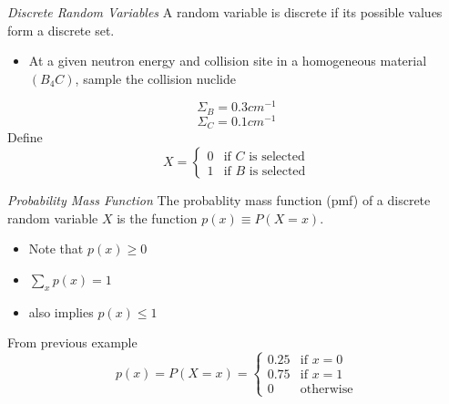 \emph{Discrete Random Variables}
 A random variable is discrete if its possible values form a discrete set.
     \begin{itemize}
      \item At a given neutron energy and collision site in a homogeneous material $(B_{4}C)$, sample the collision nuclide
     \end{itemize}
     \begin{equation*}
         \Sigma_{B} = 0.3 cm^{-1}
     \end{equation*}
     \begin{equation*}
         \Sigma_{C} = 0.1 cm^{-1}
     \end{equation*}
     Define
     \begin{displaymath}
        X = \left\{ \begin{array}{ll}
                     0 & \textrm{if $C$ is selected}\\
                     1 & \textrm{if $B$ is selected}
                    \end{array} \right.
     \end{displaymath}


\emph{Probability Mass Function}
 The probablity mass function (pmf) of a discrete random variable $X$ is the function $p(x) \equiv P(X=x)$.
     \begin{itemize}
      \item Note that $p(x) \ge 0$
      \item $\sum_{x} p(x) = 1$
      \item also implies $p(x) \le 1$
     \end{itemize}
     From previous example
     \begin{displaymath}
        p(x) = P(X=x) = \left\{ \begin{array}{ll}
                         0.25 & \textrm{if $x=0$}\\                       
                         0.75 & \textrm{if $x=1$}\\
                         0 & \textrm{otherwise}
                       \end{array} \right.
     \end{displaymath}


